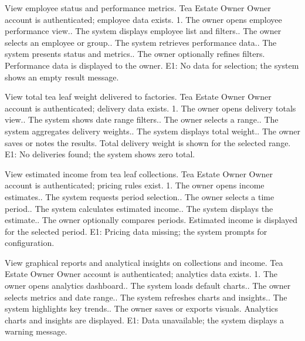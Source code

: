 {View employee status and performance metrics.}
{Tea Estate Owner}
{Owner account is authenticated; employee data exists.}
{1. The owner opens employee performance view.. The system displays employee list and filters.. The owner selects an employee or group.. The system retrieves performance data.. The system presents status and metrics.. The owner optionally refines filters.}
{Performance data is displayed to the owner.}
{E1: No data for selection; the system shows an empty result message.}

{View total tea leaf weight delivered to factories.}
{Tea Estate Owner}
{Owner account is authenticated; delivery data exists.}
{1. The owner opens delivery totals view.. The system shows date range filters.. The owner selects a range.. The system aggregates delivery weights.. The system displays total weight.. The owner saves or notes the results.}
{Total delivery weight is shown for the selected range.}
{E1: No deliveries found; the system shows zero total.}

{View estimated income from tea leaf collections.}
{Tea Estate Owner}
{Owner account is authenticated; pricing rules exist.}
{1. The owner opens income estimates.. The system requests period selection.. The owner selects a time period.. The system calculates estimated income.. The system displays the estimate.. The owner optionally compares periods.}
{Estimated income is displayed for the selected period.}
{E1: Pricing data missing; the system prompts for configuration.}

{View graphical reports and analytical insights on collections and income.}
{Tea Estate Owner}
{Owner account is authenticated; analytics data exists.}
{1. The owner opens analytics dashboard.. The system loads default charts.. The owner selects metrics and date range.. The system refreshes charts and insights.. The system highlights key trends.. The owner saves or exports visuals.}
{Analytics charts and insights are displayed.}
{E1: Data unavailable; the system displays a warning message.}

